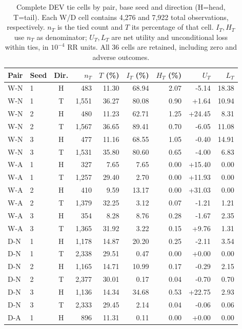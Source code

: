\begin{table}[htbp]
\centering\footnotesize\setlength{\tabcolsep}{3pt}
\caption{Complete DEV tie cells by pair, base seed and direction (H=head, T=tail). Each W/D cell contains 4,276 and 7,922 total observations, respectively. $n_T$ is the tied count and $T$ its percentage of that cell. $I_T,H_T$ use $n_T$ as denominator; $U_T,L_T$ are net utility and unconditional loss within ties, in $10^{-4}$ RR units. All 36 cells are retained, including zero and adverse outcomes.}
\label{tab:ties-dev_oof}
\begin{tabular}{llcrrrrrr}
\toprule
Pair & Seed & Dir. & $n_T$ & $T$ (\%) & $I_T$ (\%) & $H_T$ (\%) & $U_T$ & $L_T$\\
\midrule
W-N & 1 & H & 483 & 11.30 & 68.94 & 2.07 & -5.14 & 18.38\\
W-N & 1 & T & 1,551 & 36.27 & 80.08 & 0.90 & +1.64 & 10.94\\
W-N & 2 & H & 480 & 11.23 & 62.71 & 1.25 & +24.45 & 8.31\\
W-N & 2 & T & 1,567 & 36.65 & 89.41 & 0.70 & -6.05 & 11.08\\
W-N & 3 & H & 477 & 11.16 & 68.55 & 1.05 & -0.40 & 14.91\\
W-N & 3 & T & 1,531 & 35.80 & 80.60 & 0.65 & -4.00 & 6.83\\
W-A & 1 & H & 327 & 7.65 & 7.65 & 0.00 & +15.40 & 0.00\\
W-A & 1 & T & 1,257 & 29.40 & 2.70 & 0.00 & +11.93 & 0.00\\
W-A & 2 & H & 410 & 9.59 & 13.17 & 0.00 & +31.03 & 0.00\\
W-A & 2 & T & 1,379 & 32.25 & 3.12 & 0.07 & -1.21 & 1.21\\
W-A & 3 & H & 354 & 8.28 & 8.76 & 0.28 & -1.67 & 2.35\\
W-A & 3 & T & 1,365 & 31.92 & 3.22 & 0.15 & +9.76 & 1.31\\
D-N & 1 & H & 1,178 & 14.87 & 20.20 & 0.25 & -2.11 & 3.54\\
D-N & 1 & T & 2,338 & 29.51 & 0.47 & 0.00 & +0.00 & 0.00\\
D-N & 2 & H & 1,165 & 14.71 & 10.99 & 0.17 & -0.29 & 2.15\\
D-N & 2 & T & 2,377 & 30.01 & 0.17 & 0.04 & -0.70 & 0.70\\
D-N & 3 & H & 1,136 & 14.34 & 34.68 & 0.53 & +22.75 & 2.93\\
D-N & 3 & T & 2,333 & 29.45 & 2.14 & 0.04 & -0.06 & 0.06\\
D-A & 1 & H & 896 & 11.31 & 0.11 & 0.00 & +0.00 & 0.00\\

\end{tabular}
\end{table}
